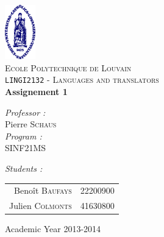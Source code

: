 \begin{titlepage}
 
\begin{center}
 
\vspace*{-2cm}\includegraphics[width=0.10\textwidth]{ucl.png}\\[1cm]
 
\textsc{\LARGE Ecole Polytechnique de Louvain}\\[1.5cm]
 
\textsc{\Large \texttt{LINGI2132} - Languages and translators }\\[0.5cm]
 
 
\vspace{1.0cm}
{ \huge \bfseries Assignement 1\vspace{0.8cm}\\}
 
\vspace{1.0cm}
 
\begin{minipage}{0.4\textwidth}
\begin{flushleft} \large
\emph{Professor :}\\
	Pierre \textsc{Schaus}\\
\vspace{1cm}
\emph{Program :}\\
	SINF21MS
\end{flushleft}
\end{minipage}
\begin{minipage}{0.4\textwidth}
\begin{flushright} \large
\emph{Students :} \\
\begin{tabular}{rl}
	Benoît \textsc{Baufays}		& {\footnotesize 22200900}\\
	Julien \textsc{Colmonts}	& {\footnotesize 41630800}\\

\end{tabular}
\end{flushright}
\end{minipage}
 
\vfill
 
\vspace{1.1cm}
{\large Academic Year 2013-2014}
\vspace{-1cm} 
\end{center}
 
\end{titlepage}
